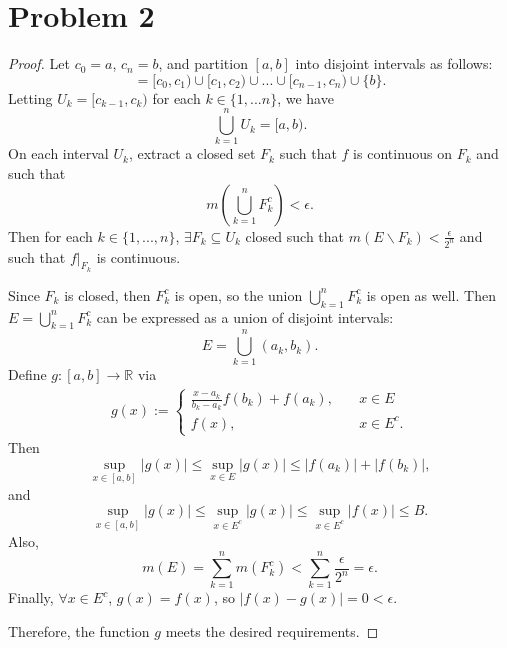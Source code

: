 \documentclass{article}
\newcommand{\R}{\mathbb{R}} %
\begin{document}
\section*{Problem 2}
\begin{proof}
	Let $c_0=a$, $c_n=b$, and partition $[a, b]$ into disjoint intervals as follows:
	\begin{equation}
		[a, b] = [c_0, c_1) \cup [c_1, c_2) \cup ... \cup [c_{n-1}, c_n) \cup \{b\}.
	\end{equation}
	Letting $U_k = [c_{k-1}, c_k)$ for each $k \in \{1, ... n\}$, we have
	\begin{equation}
		\bigcup_{k=1}^n U_k = [a, b).
	\end{equation}
	On each interval $U_k$, extract a closed set $F_k$ such that $f$ is continuous on $F_k$ and such that
	\begin{equation}
		m\left(\bigcup_{k=1}^n F_k^c\right) < \epsilon.
	\end{equation}
	Then for each $k \in \{1, ..., n\}$, $\exists F_k \subseteq U_k$ closed such that $m(E \backslash F_k) < \frac{\epsilon}{2^n}$ and such that $f\big|_{F_k}$ is continuous.
	
	Since $F_k$ is closed, then $F_k^c$ is open, so the union $\bigcup_{k=1}^n F_k^c$ is open as well. Then $E = \bigcup_{k=1}^n F_k^c$ can be expressed as a union of disjoint intervals:
	\begin{equation}
		E = \bigcup_{k=1}^n (a_k, b_k).
	\end{equation}
	Define $g: [a, b] \to \R$ via
	\begin{align}
		g(x) := \begin{cases}
			\frac{x - a_k}{b_k - a_k}f(b_k) + f(a_k), \quad &x \in E \\
			f(x), \quad &x \in E^c.
		\end{cases}
	\end{align}
	Then
	\begin{equation}
		\sup_{x \in [a, b]}|g(x)| \leq \sup_{x \in E}|g(x)| \leq |f(a_k)| + |f(b_k)|,
	\end{equation}
	and
	\begin{equation}
		\sup_{x \in [a, b]}|g(x)| \leq \sup_{x \in E^c}|g(x)| \leq \sup_{x \in E^c}|f(x)| \leq B.
	\end{equation}
	Also, 
	\begin{equation}
		m(E) = \sum_{k=1}^n m(F_k^c) < \sum_{k=1}^n \frac{\epsilon}{2^n} = \epsilon.
	\end{equation}
	Finally, $\forall x \in E^c$, $g(x) = f(x)$, so $|f(x) - g(x)| = 0 < \epsilon$.
	
	Therefore, the function $g$ meets the desired requirements.
\end{proof}
\end{document}
